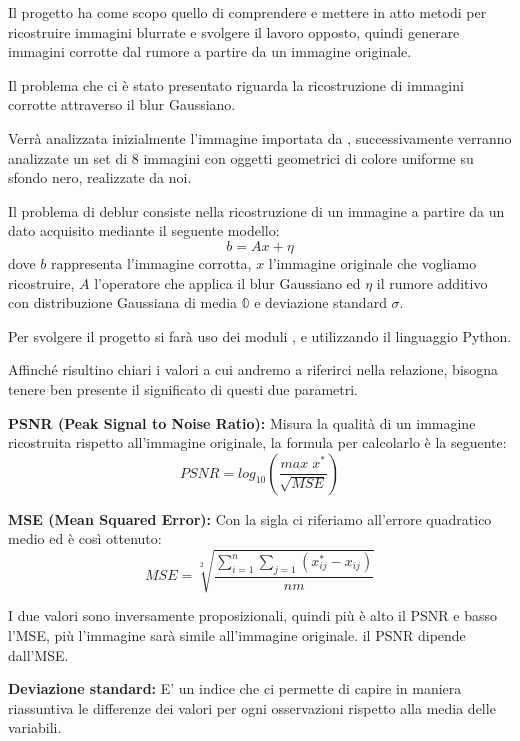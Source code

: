 Il progetto ha come scopo quello di comprendere e mettere in atto metodi per ricostruire 
immagini blurrate e svolgere il lavoro opposto, quindi generare immagini corrotte dal rumore 
a partire da un immagine originale. 

Il problema che ci è stato presentato riguarda la ricostruzione di 
immagini corrotte attraverso il blur Gaussiano.

Verrà analizzata inizialmente l'immagine  importata da
, successivamente verranno analizzate un set di 8 immagini con oggetti geometrici
 di colore uniforme su sfondo nero, realizzate da noi.

Il problema di deblur consiste nella ricostruzione di un immagine a partire da un dato acquisito
 mediante il seguente modello:
\[b=Ax+\eta\]
dove $b$ rappresenta l'immagine corrotta, $x$ l'immagine originale che vogliamo ricostruire, $A$ 
l'operatore che applica il blur Gaussiano ed $\eta$ il rumore additivo con distribuzione Gaussiana di
 media $\mathbb{0}$ e deviazione standard $\sigma$.

Per svolgere il progetto si farà uso dei moduli ,  e 
utilizzando il linguaggio Python.

Affinché risultino chiari i valori a cui andremo a riferirci nella relazione, bisogna tenere ben presente 
il significato di questi due parametri. 

\textbf{PSNR (Peak Signal to Noise Ratio):} Misura la qualità di un immagine ricostruita rispetto all'immagine 
originale, la formula per calcolarlo è la seguente: \[PSNR = log_{10}(\frac{max\;x^\ast}{\sqrt{MSE}})\]

\textbf{MSE (Mean Squared Error):}  Con la sigla ci riferiamo all'errore quadratico medio ed è così ottenuto:
 \[MSE = \sqrt[2]{\frac{\sum_{i=1}^n\sum_{j=1}(x^{\ast}_{ij}-x_{ij})}{nm}}\]

I due valori sono inversamente proposizionali, quindi più è alto il PSNR e basso l'MSE, più l'immagine sarà 
simile all'immagine originale. il PSNR dipende dall'MSE.

\textbf{Deviazione standard:} E' un indice che ci permette di capire in maniera riassuntiva le differenze dei 
valori per ogni osservazioni rispetto alla media delle variabili. 
